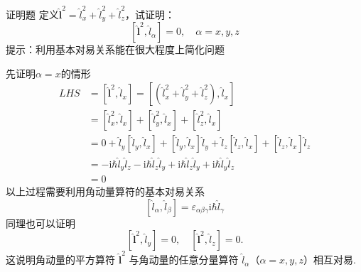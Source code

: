 \begin{question}{证明题}
    定义$\hat{\boldsymbol{l}}^2 = \hat{l}_x^2 + \hat{l}_y^2 + \hat{l}_z^2$，试证明：
    $$
        \left[\hat{\boldsymbol{l}}^2, \hat{l}_{\alpha}\right] = 0,
        \quad \alpha=x,y,z
    $$
    提示：利用基本对易关系能在很大程度上简化问题
\end{question}
\begin{solution}
    先证明$\alpha=x$的情形
    $$
        \begin{aligned}
            LHS
             & = \left[\hat{\boldsymbol{l}}^2, \hat{l}_x\right] = \left[\left(\hat{l}_x^2+\hat{l}_y^2+\hat{l}_z^2\right), \hat{l}_x\right]                                                     \\
             & = \left[\hat{l}_x^2, \hat{l}_x\right] + \left[\hat{l}_y^2, \hat{l}_x\right] + \left[\hat{l}_z^2, \hat{l}_x\right]                                                               \\
             & = 0+\hat{l}_y\left[\hat{l}_y, \hat{l}_x\right]+\left[\hat{l}_y, \hat{l}_x\right]\hat{l}_y+\hat{l}_z\left[\hat{l}_z, \hat{l}_x\right]+\left[\hat{l}_z, \hat{l}_x\right]\hat{l}_z \\
             & =-\mathrm{i}\hbar\hat{l}_y\hat{l}_z-\mathrm{i}\hbar\hat{l}_z\hat{l}_y+\mathrm{i}\hbar\hat{l}_z\hat{l}_y+\mathrm{i}\hbar\hat{l}_y\hat{l}_z                                       \\
             & =0
        \end{aligned}
    $$
    以上过程需要利用角动量算符的基本对易关系
    $$
        \left[\hat{l}_{\alpha}, \hat{l}_{\beta}\right]=\varepsilon_{\alpha\beta\gamma}\mathrm{i}\hbar\hat{l}_{\gamma}
    $$
    同理也可以证明
    $$
        \left[\hat{\boldsymbol{l}}^2, \hat{l}_y\right] = 0,
        \quad
        \left[\hat{\boldsymbol{l}}^2, \hat{l}_z\right] = 0.
    $$
    这说明角动量的平方算符 $\hat{\boldsymbol{l}}^2$ 与角动量的任意分量算符 $\hat{l}_{\alpha}$（$\alpha=x, y, z$）相互对易.
\end{solution}




